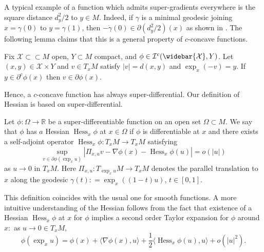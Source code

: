 A typical example of a function which admits super-gradients everywhere
is the square distance \( d _ { y } ^ { 2 } / 2 \) to \( y \in M \).
Indeed, if \( \gamma \) is a minimal geodesic
joining \( x = \gamma ( 0 ) \) to \( y = \gamma ( 1 ) \),
then \( - \dot { \gamma } ( 0 ) \in \partial \left( d _ { y } ^ { 2 } / 2 \right) ( x ) \)  as shown in \cite[Proposition 7]{mccann2001polar}.
The following lemma \cite[Lemma 3.7]{cordero2001riemannian} claims that
this is a general property of $c$-concave functions.

\begin{lem}
	\label{lem:c-super-gradients_imply_super-gradients}
	Fix \( \mathcal { X } \subset \subset M \) open,
	\( Y \subset M \) compact, and \( \phi \in \mathcal { I } ^ { c } ( \widebar { \mathcal{X} } , Y ) \).
	Let \( ( x , y ) \in \mathcal { X } \times Y \) and \( v \in T _ { x } M \) satisfy
	\( | v | = d ( x , y ) \) and \( \exp _ { x } ( - v ) = y\).
	If \( y \in \partial ^ { c } \phi ( x ) \) then
	\( v \in \partial \phi ( x ) \).
\end{lem}
Hence, a $c$-concave function has always super-differential.
Our definition of Hessian is based on super-differential.

\begin{defn}[Hessian]
	Let \( \phi : \Omega \rightarrow \mathbb { R } \) be a	super-differentiable function on an open set \( \Omega \subset M \).
	We say that \( \phi \) has \( a \) Hessian \( \operatorname{Hess}_x\phi \) at \( x \in \Omega \) if \( \phi \) is differentiable at \( x \)
	and there exists a self-adjoint operator \( \operatorname{Hess}_x \phi : T _ { x } M \rightarrow T _ { x } M \) satisfying
	\begin{equation}
		\label{defn:hessian}
		\sup _ { v \in \partial \phi \left( \exp _ { x } u \right) }
		\left| \Pi _ { x , u } v - \nabla \phi ( x ) - \operatorname{Hess}_x \phi (u) \right| = o ( | u | )
	\end{equation}
	as \( u \rightarrow 0 \) in \( T _ { x } M \).
	Here \( \Pi _ { x , u } : T _ { \exp _ { x } u } M \rightarrow T _ { x } M \) denotes the parallel translation to \( x \) along the geodesic \( \gamma ( t ) : = \exp _ { x } \left( (1-t) u  \right)\), $t \in [0,1]$.
\end{defn}

This definition coincides with the usual one for smooth functions.
A more intuitive understanding of the Hessian follows from the fact that
existence of a Hessian \( \operatorname{Hess}_x \phi \) at \( x \) for \( \phi \) implies a second order Taylor expansion for \( \phi \) around \( x : \) as \( u \rightarrow 0 \in T _ { x } M \),
\begin{equation}
	\label{equa:hessian_expan}
	\phi \left( \exp _ { x } u \right) = \phi ( x ) + \langle \nabla \phi ( x ) , u \rangle +
	\frac { 1 } { 2 } \langle \operatorname{Hess}_x \phi (u) , u \rangle + o \left( | u | ^ { 2 } \right).
\end{equation}

